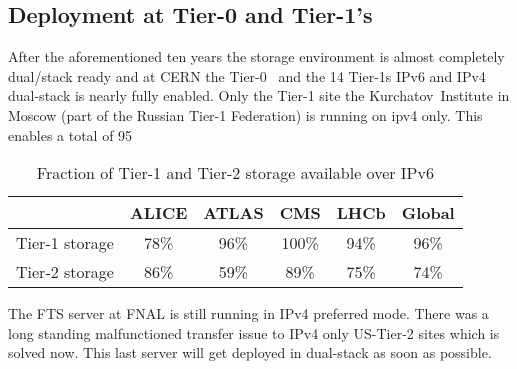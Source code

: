 
%

\subsection{Deployment at Tier-0 and Tier-1's}
After the aforementioned ten years the storage environment is almost completely dual/stack ready and at CERN the Tier-0  and the 14 Tier-1s IPv6 and IPv4 dual-stack is nearly fully enabled. Only the Tier-1 site the Kurchatov Institute in Moscow (part of the Russian Tier-1 Federation) is running on ipv4 only. This enables a total of 95%
\begin{table}[h]	
	\centering
	\caption{Fraction of Tier-1 and Tier-2 storage available over IPv6}
	\label{tab:t12stor}
	\begin{tabular}{lccccc}
	\hline
	& ALICE & ATLAS & CMS & LHCb & Global \\\hline
	Tier-1 storage & 78\% & 96\% & 100\% & 94\% & 96\% \\ 
	Tier-2 storage & 86\% & 59\% & 89\% & 75\% & 74\% \\\hline
	\end{tabular}
	\end{table}
The FTS server at FNAL is still running in IPv4 preferred mode. There was a long standing malfunctioned transfer issue to IPv4 only US-Tier-2 sites which is solved now. This last server will get deployed in dual-stack as soon as possible.
